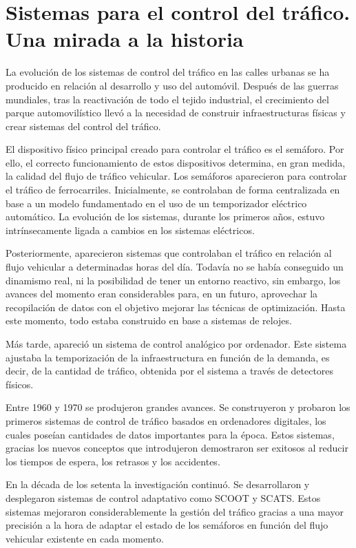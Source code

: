 \chapter{Sistemas para el control del tráfico. Una mirada a la historia}
    \label{chap:two}
La evolución de los sistemas de control del tráfico en las calles urbanas se ha producido en relación al desarrollo y uso del automóvil. Después de las guerras mundiales, tras la reactivación de todo el tejido industrial,  el crecimiento del parque automovilístico llevó a la necesidad de construir infraestructuras físicas y crear sistemas del control del tráfico.

El dispositivo físico principal creado para controlar el tráfico es el semáforo. Por ello, el correcto funcionamiento de estos dispositivos determina, en gran medida, la calidad del flujo de tráfico vehicular. Los semáforos aparecieron para controlar el tráfico de ferrocarriles. Inicialmente, se controlaban de forma centralizada en base a un modelo fundamentado en el uso de un temporizador eléctrico automático. La evolución de los sistemas, durante los primeros años, estuvo intrínsecamente ligada a cambios en los sistemas eléctricos.

Posteriormente, aparecieron sistemas que controlaban el tráfico en relación al flujo vehicular a determinadas horas del día. Todavía no se había conseguido un dinamismo real, ni la posibilidad de tener un entorno reactivo, sin embargo, los avances del momento eran considerables para, en un futuro, aprovechar la recopilación de datos con el objetivo mejorar las técnicas de optimización. Hasta este momento, todo estaba construido en base a sistemas de relojes.

Más tarde, apareció un sistema de control analógico por ordenador. Este sistema ajustaba la temporización de la infraestructura en función de la demanda, es decir, de la cantidad de tráfico, obtenida por el sistema a través de detectores físicos.

Entre 1960 y 1970 se produjeron grandes avances. Se construyeron y probaron los primeros sistemas de control de tráfico basados en ordenadores digitales, los cuales poseían cantidades de datos importantes para la época. Estos sistemas, gracias los nuevos conceptos que introdujeron demostraron ser exitosos al reducir los tiempos de espera, los retrasos y los accidentes.

En la década de los setenta la investigación continuó. Se desarrollaron y desplegaron sistemas de control adaptativo como SCOOT y SCATS. Estos sistemas mejoraron considerablemente la gestión del tráfico gracias a una mayor precisión a la hora de adaptar el estado de los semáforos en función del flujo vehicular existente en cada momento. 

